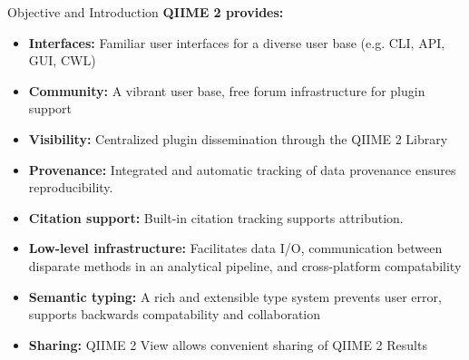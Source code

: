 \documentclass[final]{beamer}
\newlength{\colwidth}
\begin{document}
\begin{frame}[t]
\begin{columns}[t]
\begin{column}{\colwidth}
\begin{block}{Objective and Introduction}
    \textbf{QIIME 2 provides:}
    \begin{itemize}
      \item \textbf{Interfaces:} Familiar user interfaces for a diverse
      user base (e.g. CLI, API, GUI, CWL)
      \item \textbf{Community:} A vibrant user base, free forum infrastructure for
      plugin support
      \item \textbf{Visibility:} Centralized plugin dissemination through the QIIME 2
      Library
      \item \textbf{Provenance:} Integrated and automatic tracking of data provenance
      ensures reproducibility.
      \item \textbf{Citation support:} Built-in citation tracking supports attribution.
      \item \textbf{Low-level infrastructure:} Facilitates data I/O, communication
      between disparate methods in an analytical pipeline, and cross-platform compatability
      \item \textbf{Semantic typing:} A rich and extensible type system prevents user
      error, supports backwards compatability and collaboration
      \item \textbf{Sharing:} QIIME 2 View allows convenient sharing of QIIME 2 Results
    \end{itemize}
  \end{block}



\end{column}
\end{columns}
\end{frame}
\end{document}
